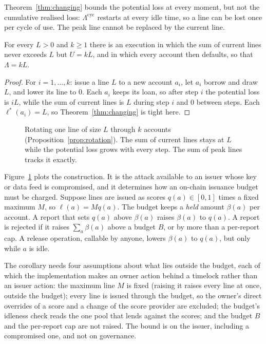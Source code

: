 \documentclass[acmsmall,nonacm,screen]{acmart}
\theoremstyle{acmdefinition}%
\begin{document}
Theorem~\ref{thm:changing} bounds the potential loss at every moment, but not the cumulative
realised loss: $\Lambda^{\mathrm{cyc}}$ restarts at every idle time, so a line can be lost once per
cycle of use. The peak line cannot be replaced by the current line.

\begin{proposition}[Rotation]\label{prop:rotation}
For every $L>0$ and $k\ge1$ there is an execution in which the sum of current lines never exceeds $L$
but $U=kL$, and in which every account then defaults, so that $\Lambda=kL$.
\end{proposition}

\begin{proof}
For $i=1,\dots,k$: issue a line $L$ to a new account $a_i$, let $a_i$ borrow and draw $L$, and
lower its line to $0$. Each $a_i$ keeps its loan, so after step $i$ the potential loss is $iL$, while
the sum of current lines is $L$ during step $i$ and $0$ between steps. Each $\ell^*(a_i)=L$, so
Theorem~\ref{thm:changing} is tight here.
\end{proof}

\begin{figure}[t]
  \centering
  
  \caption{Rotating one line of size $L$ through $k$ accounts (Proposition~\ref{prop:rotation}).
  The sum of current lines stays at $L$ while the potential loss grows with every step. The sum of
  peak lines tracks it exactly.}
  \label{fig:rotation}
\end{figure}

Figure~\ref{fig:rotation} plots the construction. It is the attack available to an issuer whose key
or data feed is compromised, and it determines how an on-chain issuance budget must be charged.
Suppose lines are issued as scores $q(a)\in[0,1]$ times a fixed maximum $M$, so $\ell(a)=Mq(a)$. The
budget keeps a \emph{held} amount $\beta(a)$ per account. A report that sets $q(a)$ above $\beta(a)$
raises $\beta(a)$ to $q(a)$. A report is rejected if it raises $\sum_a\beta(a)$ above a budget $B$, or
by more than a per-report cap. A release operation, callable by anyone, lowers $\beta(a)$ to $q(a)$,
but only while $a$ is idle.

The corollary needs four assumptions about what lies outside the budget, each of which the
implementation makes an owner action behind a timelock rather than an issuer action: the maximum
line $M$ is fixed (raising it raises every line at once, outside the budget); every line is issued
through the budget, so the owner's direct overrides of a score and a change of the score provider
are excluded; the budget's idleness check reads the one pool that lends against the scores; and the
budget $B$ and the per-report cap are not raised. The bound is on the issuer, including a compromised
one, and not on governance.
\end{document}
